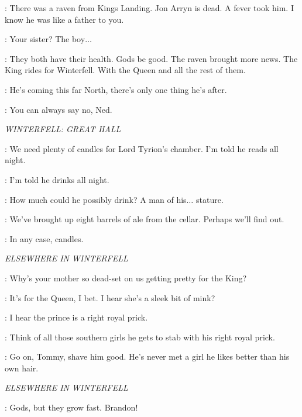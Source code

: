 \CATELYN: There was a raven from Kings Landing. Jon Arryn is dead. A fever took him. I know he was like a father to you. 

\NED: Your sister? The boy$\ldots$ 

\CATELYN: They both have their health. Gods be good. The raven brought more news. The King rides for Winterfell. With the Queen and all the rest of them. 

\NED: He's coming this far North, there's only one thing he's after. 

\CATELYN: You can always say no, Ned. 


\scene

\textit{WINTERFELL: GREAT HALL} 


\CATELYN: We need plenty of candles for Lord Tyrion's chamber. I'm told he reads all night. 

\LUWIN: I'm told he drinks all night. 

\CATELYN: How much could he possibly drink? A man of his$\ldots$ stature. 

\LUWIN: We've brought up eight barrels of ale from the cellar. Perhaps we'll find out. 

\CATELYN: In any case, candles. 


\scene

\textit{ELSEWHERE IN WINTERFELL} 


\JON:  Why's your mother so dead-set on us getting pretty for the King? 

\THEON: It's for the Queen, I bet. I hear she's a sleek bit of mink? 

\ROBB: I hear the prince is a right royal prick. 

\THEON: Think of all those southern girls he gets to stab with his right royal prick. 

\ROBB: Go on, Tommy, shave him good. He's never met a girl he likes better than his own hair. 


\scene

\textit{ELSEWHERE IN WINTERFELL} 


\CATELYN: Gods, but they grow fast.  Brandon! 


